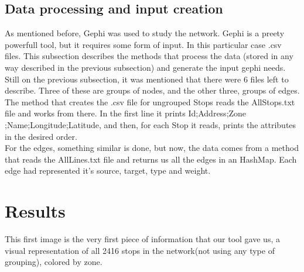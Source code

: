 \documentclass[12pt]{article}
\begin{document}
\subsection{Data processing and input creation}
	
	As mentioned before, Gephi was used to study the network. Gephi is a preety powerfull tool, but it requires some form of input. In this particular case .csv files. This subsection describes the methods that process the data (stored in any way described in the previous subsection) and generate the input gephi needs.\\
	Still on the previous subsection, it was mentioned that there were 6 files left to describe. Three of these are groups of nodes, and the other three, groups of edges.\\
	
	The method that creates the .csv file for ungrouped Stops reads the  AllStops.txt file and works from there. In the first line it prints Id;Address;Zone\\;Name;Longitude;Latitude, and then, for each Stop it reads, prints the attributes in the desired order.\\
	For the edges, something similar is done, but now, the data comes from a method that reads the AllLines.txt file and returns us all the edges in an HashMap. Each edge had represented it's source, target, type and weight.
	
	
	
	
\section{Results}
	This first image is the very first piece of information that our tool gave us, a visual representation of all 2416 stops in the network(not using any type of grouping), colored by zone.\\
\end{document}
